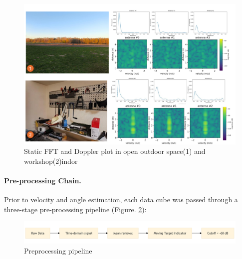\begin{figure}[H]
    \centering
    \includegraphics[width=\linewidth]{Src/images/doplere22.png}
    \caption{Static FFT and Doppler plot in open outdoor space(1) and workshop(2)indor}
    \label{fig:dopplere2}
\end{figure}


\paragraph{Pre-processing Chain.}
Prior to velocity and angle estimation, each data cube was passed through a three-stage pre-processing pipeline (Figure. \ref{fig:proc_chain}):




\begin{figure}[H]
    \centering
    \includegraphics[width=1\linewidth]{Src//images/mermaid-diagram-2025-06-02-2353291.png}
    \caption{Preprocessing pipeline}
    \label{fig:proc_chain}
\end{figure}




